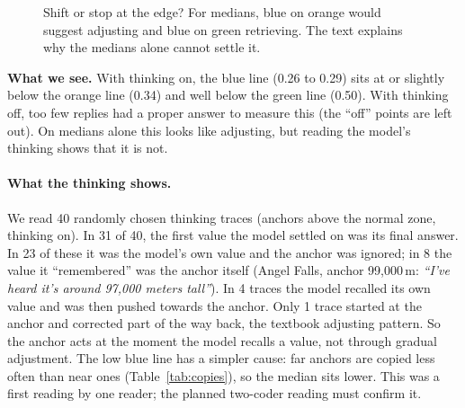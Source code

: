 \documentclass[11pt,a4paper]{article}
\begin{document}
\begin{figure}[ht]
\centering
{}
\caption{Shift or stop at the edge? For medians, blue on orange would suggest adjusting and blue on green retrieving. The text explains why the medians alone cannot settle it.}
\label{fig:nearfar}
\end{figure}

\noindent\textbf{What we see.} With thinking on, the blue line (0.26 to 0.29) sits at or slightly below the orange line (0.34) and well below the green line (0.50). With thinking off, too few replies had a proper answer to measure this (the \enquote{off} points are left out). On medians alone this looks like adjusting, but reading the model's thinking shows that it is not.

\paragraph{What the thinking shows.} We read 40 randomly chosen thinking traces (anchors above the normal zone, thinking on). In 31 of 40, the first value the model settled on was its final answer. In 23 of these it was the model's own value and the anchor was ignored; in 8 the value it \enquote{remembered} was the anchor itself (Angel Falls, anchor 99,000\,m: \emph{\enquote{I've heard it's around 97,000 meters tall}}). In 4 traces the model recalled its own value and was then pushed towards the anchor. Only 1 trace started at the anchor and corrected part of the way back, the textbook adjusting pattern. So the anchor acts at the moment the model recalls a value, not through gradual adjustment. The low blue line has a simpler cause: far anchors are copied less often than near ones (Table~\ref{tab:copies}), so the median sits lower. This was a first reading by one reader; the planned two-coder reading must confirm it.
\end{document}
